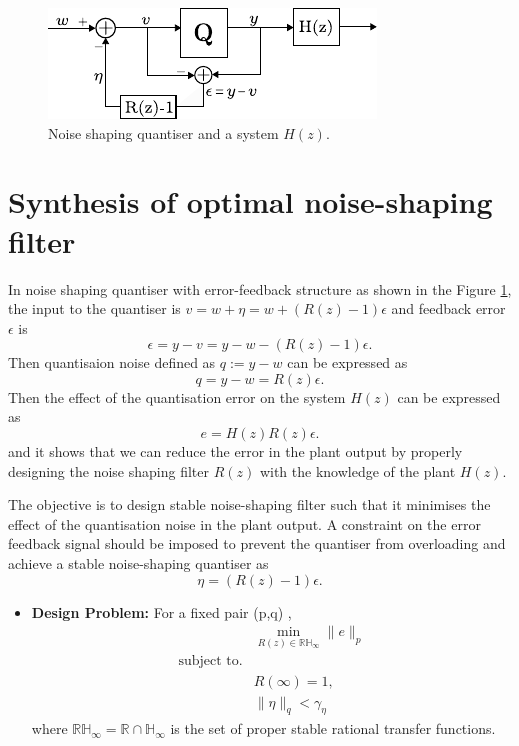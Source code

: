 \documentclass[a4paper]{article}
\begin{document}
\newpage
\begin{figure}[!h]
	\centering
	\includegraphics[scale = 2]{figures/nsq_error_feedback.pdf}
	\caption{Noise shaping quantiser and a system $H(z)$.}
	\label{fig:nsq_efs}
\end{figure}
\section{Synthesis of optimal noise-shaping filter}
In noise shaping quantiser with error-feedback structure as shown in the Figure \ref{fig:nsq_efs}, the input to the quantiser is  $v = w + \eta = w + (R(z)-1)\epsilon$
and  feedback error $\epsilon$ is 
\begin{equation}
	\epsilon = y - v = y - w - (R(z)-1)\epsilon.
\end{equation}
Then quantisaion noise defined as $q := y - w$ can be expressed as 
\begin{equation}
	 q = y - w = R(z) \epsilon.
\end{equation}
Then the effect of the quantisation error on the system $H(z)$ can be expressed as 
\begin{equation}	
	 e = H(z) R(z) \epsilon.
	 \label{eq:err_plant}
\end{equation}
and it shows that we can reduce the error in the plant output by properly designing the noise shaping filter $R(z)$ with the knowledge of the plant $H(z)$. 

The objective is to design stable noise-shaping filter such that it minimises the effect of the quantisation noise in the plant output. A constraint on the error feedback signal should be imposed to prevent the quantiser from overloading and achieve a stable noise-shaping quantiser as $$ \eta = (R(z) - 1) \epsilon.$$

\begin{itemize}
	\item \textbf{Design Problem:} For a fixed pair (p,q) \cite{Shuichi2017}, 
	\begin{equation}
		\begin{aligned}
			&\min_{R(z) \in \mathbb{RH}_{\infty}} \| e \|_{p}  \\
			\textrm{subject  to.}& \\
			& R(\infty)	 = 1, \\
			& \|\eta\|_{q} < \gamma_{\eta}
		\end{aligned}	
	\end{equation}	
	where $\mathbb{RH}_{\infty} = \mathbb{R} \cap \mathbb{H}_{\infty}$ is the set of proper stable rational transfer functions.
\end{itemize}
\end{document}
